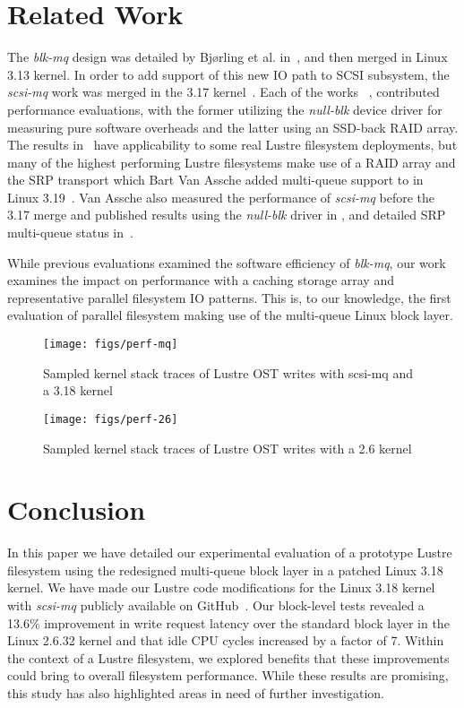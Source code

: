 \documentclass[conference]{IEEEtran}
\begin{document}
\section{Related Work}
\label{sec:related}

The \emph{blk-mq} design was detailed by Bj{\o}rling et al. in~\cite{bjorling13}, and then merged in Linux 3.13 kernel.
In order to add support of this new IO path to SCSI subsystem, the \emph{scsi-mq} work was merged in the 3.17 kernel~\cite{hellwig14}.
Each of the works ~\cite{bjorling13, hellwig14}, contributed performance evaluations, with the former utilizing the \emph{null-blk}
device driver for measuring pure software overheads and the latter using an SSD-back RAID array.  The results in~\cite{hellwig14}
have applicability to some real Lustre filesystem deployments, but many of the highest performing Lustre filesystems make use of
a RAID array and the SRP transport which Bart Van Assche added multi-queue support to in Linux 3.19~\cite{assche15}.  Van Assche
also measured the performance of \emph{scsi-mq} before the 3.17 merge and published results using the \emph{null-blk} driver in \cite{www:scsimq:v1, www:scsimq:v2}, and
detailed SRP multi-queue status in~\cite{www:scsimq:ofa, assche15}.

While previous evaluations examined the software efficiency of \emph{blk-mq}, our work examines the impact on
performance with a caching storage array and representative parallel filesystem IO patterns. This is, to our knowledge,
the first evaluation of parallel filesystem making use of the multi-queue Linux block layer.

\begin{figure}[!t]
\centering
\texttt{[image: figs/perf-mq]}
\caption{Sampled kernel stack traces of Lustre OST writes with scsi-mq and a 3.18 kernel}
\label{perf-mq}
\end{figure}

\begin{figure}[!t]
\centering
\texttt{[image: figs/perf-26]}
\caption{Sampled kernel stack traces of Lustre OST writes with a 2.6 kernel}
\label{perf-2.6}
\end{figure}


\section{Conclusion}
\label{sec:concl}

In this paper we have detailed our experimental evaluation of a prototype Lustre filesystem using the redesigned
multi-queue block layer in a patched Linux 3.18 kernel. We have made our Lustre code modifications for the Linux 3.18
kernel with \emph{scsi-mq} publicly available on GitHub~\cite{www:github:lustre318}. Our block-level tests revealed
a 13.6\% improvement in write request latency
over the standard block layer in the Linux 2.6.32 kernel and that idle CPU cycles increased by a factor of 7.
Within the context of a Lustre filesystem, we explored benefits that these improvements could bring to overall
filesystem performance. While these results are promising, this study has also highlighted areas in need of further
investigation.
\end{document}
